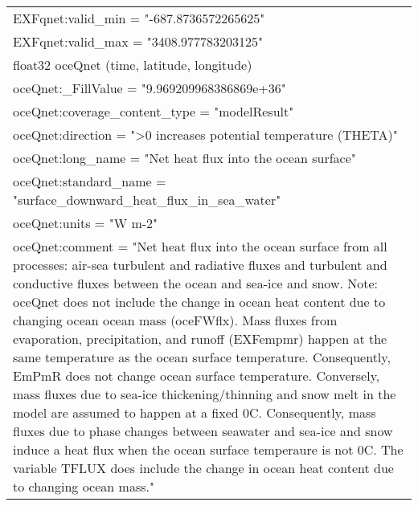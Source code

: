 \begin{longtable}{|p{\textwidth}|}
\hspace{0.5cm}\hspace{0.5cm}EXFqnet:valid\_min = "-687.8736572265625"\\
\hspace{0.5cm}\hspace{0.5cm}EXFqnet:valid\_max = "3408.977783203125"\\
\hspace{0.5cm}float32 oceQnet (time, latitude, longitude)\\
\hspace{0.5cm}\hspace{0.5cm}oceQnet:\_FillValue = "9.969209968386869e+36"\\
\hspace{0.5cm}\hspace{0.5cm}oceQnet:coverage\_content\_type = "modelResult"\\
\hspace{0.5cm}\hspace{0.5cm}oceQnet:direction = ">0 increases potential temperature (THETA)"\\
\hspace{0.5cm}\hspace{0.5cm}oceQnet:long\_name = "Net heat flux into the ocean surface"\\
\hspace{0.5cm}\hspace{0.5cm}oceQnet:standard\_name = "surface\_downward\_heat\_flux\_in\_sea\_water"\\
\hspace{0.5cm}\hspace{0.5cm}oceQnet:units = "W m-2"\\
\hspace{0.5cm}\hspace{0.5cm}oceQnet:comment = "Net heat flux into the ocean surface from all processes: air-sea turbulent and radiative fluxes and turbulent and conductive fluxes between the ocean and sea-ice and snow. Note: oceQnet does not include the change in ocean heat content due to changing ocean ocean mass (oceFWflx). Mass fluxes from evaporation, precipitation, and runoff (EXFempmr) happen at the same temperature as the ocean surface temperature. Consequently, EmPmR does not change ocean surface temperature. Conversely, mass fluxes due to sea-ice thickening/thinning and snow melt in the model are assumed to happen at a fixed 0C. Consequently, mass fluxes due to phase changes between seawater and sea-ice and snow induce a heat flux when the ocean surface temperaure is not 0C. The variable TFLUX does include the change in ocean heat content due to changing ocean mass."\\

\end{longtable}

